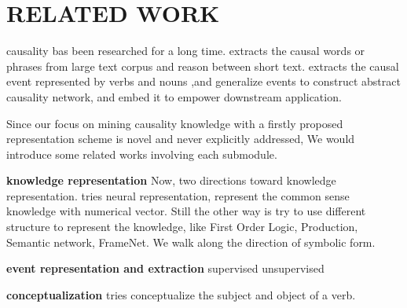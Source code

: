 \section{RELATED WORK}
\label{sec:related}

causality bas been researched for a long time. \cite{luo2016commonsense} extracts the causal words or phrases from large text corpus and reason between short text. \cite{zhao2017constructing} extracts the causal event represented by verbs and nouns ,and generalize events to construct abstract causality network, and embed it to empower downstream application.
  
Since our focus on mining causality knowledge with a firstly proposed representation scheme is novel and
never explicitly addressed, We would introduce some related works involving each submodule.

\textbf{knowledge representation}
	Now, two directions toward knowledge representation.\cite{li-16} tries neural representation, represent the common sense knowledge with numerical vector. Still the other way is try to use different structure to represent the knowledge, like First Order Logic, Production, Semantic network, FrameNet\cite{baker1998berkeley}. We walk along the direction of symbolic form. 

\textbf{event representation and extraction} supervised unsupervised
\cite{ding2016knowledge} \cite{ding2015deep}

\textbf{conceptualization}
\cite{gong2016representing} tries conceptualize the subject and object of a verb. 


